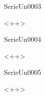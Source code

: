 \documentclass{article}
\begin{document}
\begin{corrige}{SerieUn0003}

<++>

\end{corrige}


\begin{corrige}{SerieUn0004}

<++>

\end{corrige}%


\begin{corrige}{SerieUn0005}

<++>

\end{corrige}%
\end{document}

